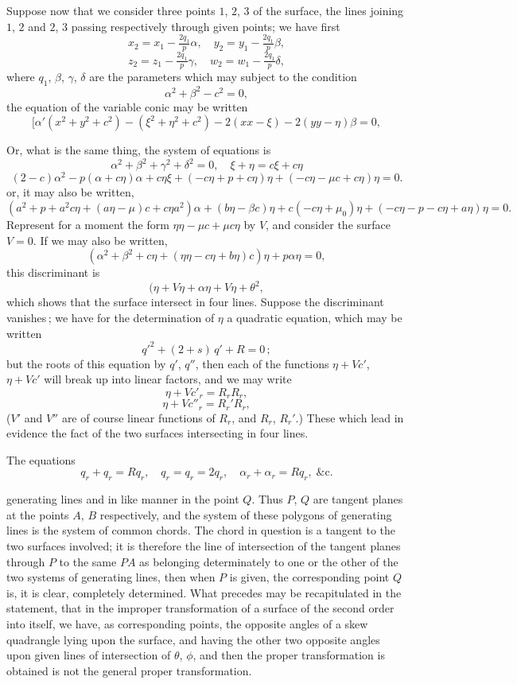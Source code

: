 \documentclass[11pt,a4paper]{book}
\begin{document}
\medskip

Suppose now that we consider three points $1$, $2$, $3$ of the surface, the lines joining
$1$, $2$ and $2$, $3$ passing respectively through given points; we have first
\[
x_2 = x_1 - \tfrac{2 q_1}{p}\alpha,\quad y_2 = y_1 - \tfrac{2 q_1}{p}\beta,
\]
\[
z_2 = z_1 - \tfrac{2 q_1}{p}\gamma,\quad w_2 = w_1 - \tfrac{2 q_1}{p}\delta,
\]
where $q_1$, $\beta$, $\gamma$, $\delta$ are the parameters which may subject to the condition
\[
\alpha^2 + \beta^2 - c^2 = 0,
\]
the equation of the variable conic may be written
\[
[\alpha'(x^2 + y^2 + c^2) - (\xi^2 + \eta^2 + c^2) - 2(xx - \xi) - 2(yy - \eta)\beta = 0,
\]
\medskip

Or, what is the same thing, the system of equations is
\[
\alpha^2 + \beta^2 + \gamma^2 + \delta^2 = 0,
\quad
\xi + \eta = c\xi + c\eta
\]
\[
(2-c)\alpha^2 - p(\alpha+c\eta)\alpha + c\eta\xi
+ (-c\eta + p + c\eta)\eta
+ (-c\eta - \mu c + c\eta)\eta = 0.
\]
or, it may also be written,
\[
(a^2 + p + a^2c\eta + (a\eta - \mu)c + c\eta a^2)\alpha + (b\eta - \beta c)\eta
+ c(-c\eta + \mu_0)\eta + (-c\eta - p - c\eta + a\eta)\eta = 0.
\]
Represent for a moment the form $\eta\eta - \mu c + \mu c\eta$ by $V$, and consider the surface
$V=0$. If we may also be written,
\[
(\alpha^2 + \beta^2 + c \eta + (\eta\eta - c\eta + b\eta)c) \eta + p \alpha \eta = 0,
\]
this discriminant is
\[
(\eta + V\eta + \alpha\eta + V\eta + \theta^2,
\]
which shows that the surface intersect in four lines. Suppose the discriminant vanishes\,;
we have for the determination of $\eta$ a quadratic equation, which may be written
\[
q'^2 + (2 + s)\,q' + R = 0\,;
\]
but the roots of this equation by $q'$, $q''$, then each of the functions $\eta + Vc'$, $\eta + Vc'$
will break up into linear factors, and we may write
\[
\eta + Vc'_r = R_r R_r,
\]
\[
\eta + V c''_r = R_r' R_r,
\]
($V'$ and $V''$ are of course linear functions of $R_r$, and $R_r$, $R_r'$.) These which lead in
evidence the fact of the two surfaces intersecting in four lines.

\medskip

The equations
\[
q_r + q_r = R q_r,
\quad q_r = q_r = 2 q_r,
\quad \alpha_r + \alpha_r = R q_r,\;\&\mathrm{c}.
\]

\medskip

generating lines and in like manner in the point $Q$. Thus $P$, $Q$ are tangent planes
at the points $A$, $B$ respectively, and the system of these polygons of generating
lines is the system of common chords. The chord in question is a tangent to the two
surfaces involved; it is therefore the line of intersection of the tangent planes through
$P$ to the same $PA$ as belonging determinately to one or the other of the two
systems of generating lines, then when $P$ is given, the corresponding point $Q$ is, it
is clear, completely determined. What precedes may be recapitulated in the statement,
that in the improper transformation of a surface of the second order into itself, we
have, as corresponding points, the opposite angles of a skew quadrangle lying upon
the surface, and having the other two opposite angles upon given lines of
intersection of $\theta$, $\phi$, and then the proper transformation is obtained is not the general
proper transformation.
\end{document}
